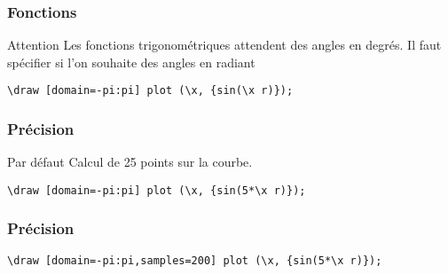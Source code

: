 \documentclass{clic_latex_beamer}
\begin{document}
\begin{frame}[fragile]
\frametitle{Fonctions}

\begin{alertblock}{Attention}
Les fonctions trigonométriques attendent des angles en degrés. Il faut spécifier si l'on souhaite des angles en radiant
\end{alertblock}

\begin{lstlisting}
\draw [domain=-pi:pi] plot (\x, {sin(\x r)});
\end{lstlisting}


\end{frame}


\begin{frame}[fragile]
\frametitle{Précision}

\begin{block}{Par défaut}
Calcul de 25 points sur la courbe.
\end{block}

\pause

\begin{lstlisting}
\draw [domain=-pi:pi] plot (\x, {sin(5*\x r)});
\end{lstlisting}


\end{frame}

\begin{frame}[fragile]
\frametitle{Précision}

\begin{lstlisting}
\draw [domain=-pi:pi,samples=200] plot (\x, {sin(5*\x r)});
\end{lstlisting}

\pause


\end{frame}
\end{document}
